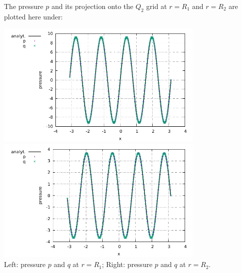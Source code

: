 The pressure $p$ and its projection onto the $Q_2$ grid at 
$r=R_1$ and $r=R_2$ are plotted here under:

\begin{center}
\includegraphics[width=10cm]{python_codes/fieldstone_21/results/pressure_R1.pdf}\\
\includegraphics[width=10cm]{python_codes/fieldstone_21/results/pressure_R2.pdf}\\
{\captionfont Left: pressure $p$ and $q$ at $r=R_1$; Right: 
pressure $p$ and $q$ at $r=R_2$.}
\end{center}

